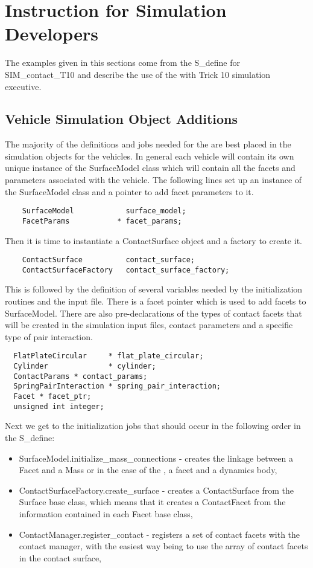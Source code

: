 \section{Instruction for Simulation Developers}
The examples given in this sections come from the S\_define for SIM\_contact\_T10 and describe the use of the \ModelDesc with Trick 10 simulation executive.
\subsection{Vehicle Simulation Object Additions}
The majority of the definitions and jobs needed for the \ModelDesc are best placed in the simulation objects for the vehicles.  In general each vehicle will contain its own unique instance of the SurfaceModel class which will contain all the facets and parameters associated with the vehicle. The following lines set up an instance of the SurfaceModel class and a pointer to add facet parameters to it.
\begin{verbatim}
    SurfaceModel            surface_model;
    FacetParams           * facet_params;
\end{verbatim}
Then it is time to instantiate a ContactSurface object and a factory to create it.
\begin{verbatim}
    ContactSurface          contact_surface;
    ContactSurfaceFactory   contact_surface_factory;
\end{verbatim}
This is followed by the definition of several variables needed by the initialization routines and the input file.  There is a facet pointer which is used to add facets to SurfaceModel.  There are also pre-declarations of the types of contact facets that will be created in the simulation input files, contact parameters and a specific type of pair interaction.
\begin{verbatim}
  FlatPlateCircular     * flat_plate_circular;
  Cylinder              * cylinder;
  ContactParams * contact_params;
  SpringPairInteraction * spring_pair_interaction;
  Facet * facet_ptr;
  unsigned int integer;

\end{verbatim}
Next we get to the initialization jobs that should occur in the following order in the S\_define:
\begin{itemize}
\item SurfaceModel.initialize\_mass\_connections - creates the linkage between a Facet and a Mass or in the case of the \ModelDesc, a facet and a dynamics body,
\item ContactSurfaceFactory.create\_surface - creates a ContactSurface from the Surface base class, which means that it creates a ContactFacet from the information contained in each Facet base class,
\item ContactManager.register\_contact - registers a set of contact facets with the contact manager, with the easiest way being to use the array of contact facets in the contact surface,
\end{itemize}
